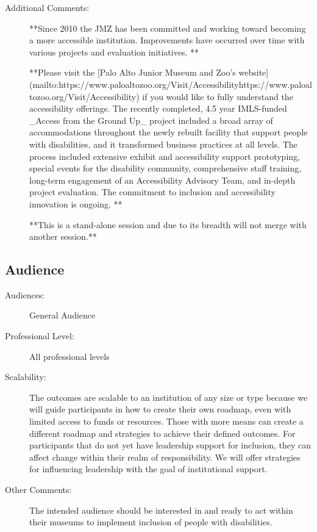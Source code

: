 \documentclass{report}
\begin{document}
\begin{description}
                    \item [Additional Comments: ]**Since 2010 the JMZ has been committed and working toward becoming a more accessible institution. Improvements have occurred over time with various projects and evaluation initiatives. **

**Please visit the [Palo Alto Junior Museum and Zoo’s website](mailto:https://www.paloaltozoo.org/Visit/Accessibilityhttps://www.paloaltozoo.org/Visit/Accessibility) if you would like to fully understand the accessibility offerings. The recently completed, 4.5 year IMLS-funded \_Access from the Ground Up\_ project included a broad array of accommodations throughout the newly rebuilt facility that support people with disabilities, and it transformed business practices at all levels. The process included extensive exhibit and accessibility support prototyping, special events for the disability community, comprehensive staff training, long-term engagement of an Accessibility Advisory Team, and in-depth project evaluation. The commitment to inclusion and accessibility innovation is ongoing. **

**This is a stand-alone session and due to its breadth will not merge with another session.**

                \end{description}
              \subsection*{Audience}
                \begin{description}
                  \item [Audiences:]General Audience~
                  \item[Professional Level:]All professional levels~
                \item[Scalability:]  The outcomes are scalable to an institution of any size or type because we will guide participants in how to create their own roadmap, even with limited access to funds or resources. Those with more means can create a different roadmap and strategies to achieve their defined outcomes. For participants that do not yet have leadership support for inclusion, they can affect change within their realm of responsibility. We will offer strategies for influencing leadership with the goal of institutional support.

							
              \item[Other Comments:] The intended audience should be interested in and ready to act within their museums to implement inclusion of people with disabilities.
              \end{description}
\end{document}
